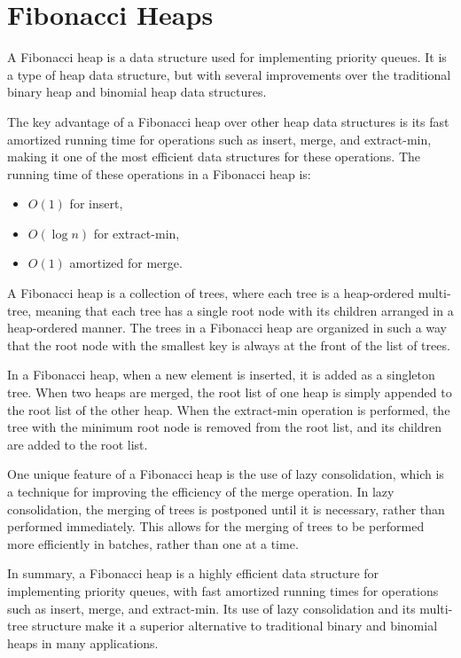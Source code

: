 \documentclass[a4paper,10pt]{article}
\begin{document}
\section{Fibonacci Heaps}

A Fibonacci heap is a data structure used for implementing priority queues. It is a type of heap data structure, but with several improvements over the traditional binary heap and binomial heap data structures.

The key advantage of a Fibonacci heap over other heap data structures is its fast amortized running time for operations such as insert, merge, and extract-min, making it one of the most efficient data structures for these operations. The running time of these operations in a Fibonacci heap is:
\begin{itemize}
    \item $O(1)$ for insert,
    \item $O(\log n)$ for extract-min,
    \item $O(1)$ amortized for merge.
\end{itemize}

A Fibonacci heap is a collection of trees, where each tree is a heap-ordered multi-tree, meaning that each tree has a single root node with its children arranged in a heap-ordered manner. The trees in a Fibonacci heap are organized in such a way that the root node with the smallest key is always at the front of the list of trees.

In a Fibonacci heap, when a new element is inserted, it is added as a singleton tree. When two heaps are merged, the root list of one heap is simply appended to the root list of the other heap. When the extract-min operation is performed, the tree with the minimum root node is removed from the root list, and its children are added to the root list.

One unique feature of a Fibonacci heap is the use of lazy consolidation, which is a technique for improving the efficiency of the merge operation. In lazy consolidation, the merging of trees is postponed until it is necessary, rather than performed immediately. This allows for the merging of trees to be performed more efficiently in batches, rather than one at a time.

In summary, a Fibonacci heap is a highly efficient data structure for implementing priority queues, with fast amortized running times for operations such as insert, merge, and extract-min. Its use of lazy consolidation and its multi-tree structure make it a superior alternative to traditional binary and binomial heaps in many applications.
\end{document}
